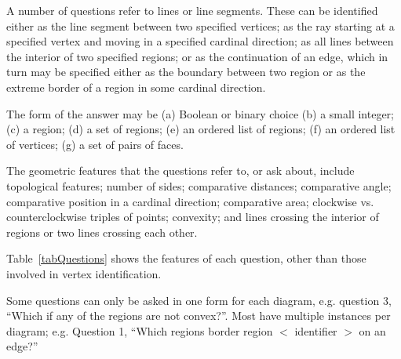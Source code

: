 \documentclass{article}    %
\begin{document}
A number of questions refer to lines or line segments. These can be identified
either as the line segment between two specified vertices; as
the ray starting at a specified vertex and moving in a specified cardinal
direction; as all lines between the interior of two specified regions; or
as the continuation of an edge, which in turn may be
specified either as the boundary between two region or as the extreme border
of a region in some cardinal direction.

The form of the answer may be
(a) Boolean or binary choice 
(b) a small integer; 
(c) a region; 
(d) a set of regions; 
(e) an ordered list of regions; 
(f) an ordered list of vertices; 
(g) a set of pairs of faces. 

The geometric features that the questions refer to, or ask about, include
topological features; number of sides; comparative distances; comparative
angle; comparative position in a cardinal direction;
comparative area; clockwise vs. counterclockwise triples of points; 
convexity; and lines crossing the interior of regions or two lines 
crossing each other.

Table~\ref{tabQuestions} shows the features of each
question, other than those involved in vertex identification.

Some questions can only be asked in one form for each diagram, 
e.g. question 3, ``Which
if any of the regions are not convex?''. Most have multiple instances per
diagram; e.g. Question 1, ``Which regions border region $<$ identifier $>$ 
on an edge?''
\end{document}
